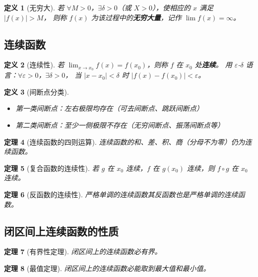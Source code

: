 \documentclass[12pt,a4paper]{ctexart}
\newtheorem{theorem}{定理}[section]
\newtheorem{definition}[theorem]{定义}
\theoremstyle{remark}
\begin{document}
\begin{definition}[无穷大]
若 $\forall M > 0$，$\exists \delta > 0$（或 $X > 0$），使相应的 $x$ 满足 $|f(x)| > M$，
则称 $f(x)$ 为该过程中的\textbf{无穷大量}，记作 $\lim f(x) = \infty$。
\end{definition}

\subsection{连续函数}

\begin{definition}[连续性]
若 $\lim_{x\to x_0} f(x) = f(x_0)$，则称 $f$ 在 $x_0$ 处\textbf{连续}。
用 $\varepsilon$-$\delta$ 语言：$\forall \varepsilon > 0$，$\exists \delta > 0$，
当 $|x-x_0|<\delta$ 时 $|f(x)-f(x_0)|<\varepsilon$。
\end{definition}

\begin{definition}[间断点分类]
\begin{itemize}
  \item 第一类间断点：左右极限均存在（可去间断点、跳跃间断点）
  \item 第二类间断点：至少一侧极限不存在（无穷间断点、振荡间断点等）
\end{itemize}
\end{definition}

\begin{theorem}[连续函数的四则运算]
连续函数的和、差、积、商（分母不为零）仍为连续函数。
\end{theorem}

\begin{theorem}[复合函数的连续性]
若 $g$ 在 $x_0$ 连续，$f$ 在 $g(x_0)$ 连续，则 $f \circ g$ 在 $x_0$ 连续。
\end{theorem}

\begin{theorem}[反函数的连续性]
严格单调的连续函数其反函数也是严格单调的连续函数。
\end{theorem}

\subsection{闭区间上连续函数的性质}

\begin{theorem}[有界性定理]
闭区间上的连续函数必有界。
\end{theorem}

\begin{theorem}[最值定理]
闭区间上的连续函数必能取到最大值和最小值。
\end{theorem}
\end{document}
